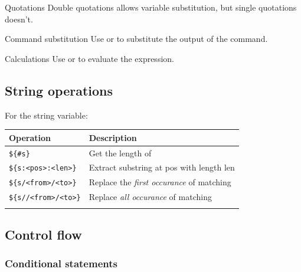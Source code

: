 \documentclass{article}
\begin{document}
\begin{knBox}
    {Quotations}
    Double quotations allows variable substitution, but single quotations doesn't.
    
\end{knBox}

\begin{knBox}
    {Command substitution}
    Use  or  to substitute the output of the command.
\end{knBox}

\begin{knBox}
    {Calculations}
    Use  or  to evaluate the expression.
\end{knBox}

\subsection{String operations}
For the  string variable:
\begin{table}[H]
    \begin{tabular}{ll}
        \textbf{Operation}            & \textbf{Description}                                        \\ \hline
        \lstinline|${#s}|             & Get the length of \Colorbox{superlightgray}{\lstinline|$s|} \\ \arrayrulecolor{lightgray}\hline
        \lstinline|${s:<pos>:<len>}|  & Extract substring at pos with length len                    \\ \arrayrulecolor{lightgray}\hline
        \lstinline|${s/<from>/<to>}|  & Replace the \emph{first occurance} of matching              \\ \arrayrulecolor{lightgray}\hline
        \lstinline|${s//<from>/<to>}| & Replace \emph{all occurance} of matching                    \\ \arrayrulecolor{lightgray}\hline
    \end{tabular}
\end{table}

\subsection{Control flow}

\subsubsection{Conditional statements}

\end{document}
